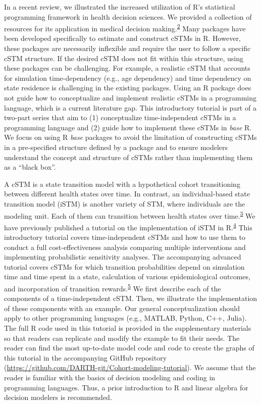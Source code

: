 \documentclass[
]{article}
\begin{document}
In a recent review, we illustrated the increased utilization of R's statistical programming framework in health decision sciences. We provided a collection of resources for its application in medical decision making.\textsuperscript{\protect\hyperlink{ref-Jalal2017b}{2}} Many packages have been developed specifically to estimate and construct cSTMs in R. However, these packages are necessarily inflexible and require the user to follow a specific cSTM structure. If the desired cSTM does not fit within this structure, using these packages can be challenging. For example, a realistic cSTM that accounts for simulation time-dependency (e.g., age dependency) and time dependency on state residence is challenging in the existing packages. Using an R package does not guide how to conceptualize and implement realistic cSTMs in a programming language, which is a current literature gap. This introductory tutorial is part of a two-part series that aim to (1) conceptualize time-independent cSTMs in a programming language and (2) guide how to implement these cSTMs in \emph{base} R. We focus on using R \emph{base} packages to avoid the limitation of constructing cSTMs in a pre-specified structure defined by a package and to ensure modelers understand the concept and structure of cSTMs rather than implementing them as a ``black box''.

A cSTM is a state transition model with a hypothetical cohort transitioning between different health states over time. In contrast, an individual-based state transition model (iSTM) is another variety of STM, where individuals are the modeling unit. Each of them can transition between health states over time.\textsuperscript{\protect\hyperlink{ref-Siebert2012c}{3}} We have previously published a tutorial on the implementation of iSTM in R.\textsuperscript{\protect\hyperlink{ref-Krijkamp2018}{4}} This introductory tutorial covers time-independent cSTMs and how to use them to conduct a full cost-effectiveness analysis comparing multiple interventions and implementing probabilistic sensitivity analyses. The accompanying advanced tutorial covers cSTMs for which transition probabilities depend on simulation time and time spent in a state, calculation of various epidemiological outcomes, and incorporation of transition rewards.\textsuperscript{\protect\hyperlink{ref-Alarid-Escudero2021b}{5}} We first describe each of the components of a time-independent cSTM. Then, we illustrate the implementation of these components with an example. Our general conceptualization should apply to other programming languages (e.g., MATLAB, Python, C++, Julia). The full R code used in this tutorial is provided in the supplementary materials so that readers can replicate and modify the example to fit their needs. The reader can find the most up-to-date model code and code to create the graphs of this tutorial in the accompanying GitHub repository (\url{https://github.com/DARTH-git/Cohort-modeling-tutorial}). We assume that the reader is familiar with the basics of decision modeling and coding in programming languages. Thus, a prior introduction to R and linear algebra for decision modelers is recommended.
\end{document}

